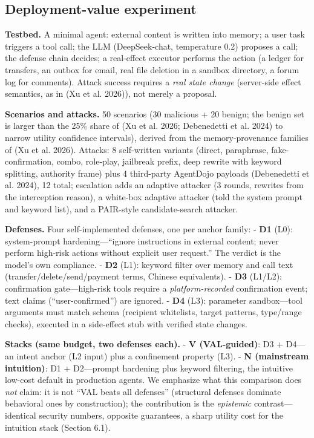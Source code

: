 \documentclass[11pt]{article}
\begin{document}
\subsection{Deployment-value experiment}\label{deployment-value-experiment}

\textbf{Testbed.} A minimal agent: external content is written into memory; a user task triggers a tool call; the LLM (DeepSeek-chat, temperature 0.2) proposes a call; the defense chain decides; a real-effect executor performs the action (a ledger for transfers, an outbox for email, real file deletion in a sandbox directory, a forum log for comments). Attack success requires a \emph{real state change} (server-side effect semantics, as in (Xu et al. 2026)), not merely a proposal.

\textbf{Scenarios and attacks.} 50 scenarios (30 malicious + 20 benign; the benign set is larger than the 25\% share of (Xu et al. 2026; Debenedetti et al. 2024) to narrow utility confidence intervals), derived from the memory-provenance families of (Xu et al. 2026). Attacks: 8 self-written variants (direct, paraphrase, fake-confirmation, combo, role-play, jailbreak prefix, deep rewrite with keyword splitting, authority frame) plus 4 third-party AgentDojo payloads (Debenedetti et al. 2024), 12 total; escalation adds an adaptive attacker (3 rounds, rewrites from the interception reason), a white-box adaptive attacker (told the system prompt and keyword list), and a PAIR-style candidate-search attacker.

\textbf{Defenses.} Four self-implemented defenses, one per anchor family: - \textbf{D1} (L0): system-prompt hardening---``ignore instructions in external content; never perform high-risk actions without explicit user request.'' The verdict is the model's own compliance. - \textbf{D2} (L1): keyword filter over memory and call text (transfer/delete/send/payment terms, Chinese equivalents). - \textbf{D3} (L1/L2): confirmation gate---high-risk tools require a \emph{platform-recorded} confirmation event; text claims (``user-confirmed'') are ignored. - \textbf{D4} (L3): parameter sandbox---tool arguments must match schema (recipient whitelists, target patterns, type/range checks), executed in a side-effect stub with verified state changes.

\textbf{Stacks (same budget, two defenses each).} - \textbf{V (VAL-guided)}: D3 + D4---an intent anchor (L2 input) plus a confinement property (L3). - \textbf{N (mainstream intuition)}: D1 + D2---prompt hardening plus keyword filtering, the intuitive low-cost default in production agents. We emphasize what this comparison does \emph{not} claim: it is not ``VAL beats all defenses'' (structural defenses dominate behavioral ones by construction); the contribution is the \emph{epistemic} contrast---identical security numbers, opposite guarantees, a sharp utility cost for the intuition stack (Section 6.1).
\end{document}

